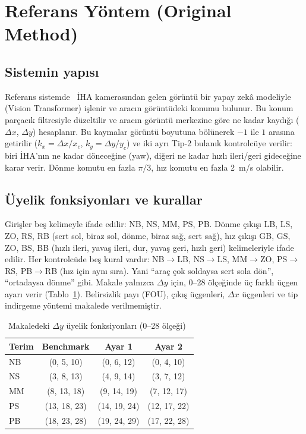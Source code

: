 \documentclass[conference,a4paper]{IEEEtran}
\begin{document}
\section{Referans Yöntem (Original Method)}
\subsection{Sistemin yapısı}
Referans sistemde~\cite{li2024} İHA kamerasından gelen görüntü bir yapay zekâ modeliyle (Vision Transformer) işlenir ve aracın görüntüdeki konumu bulunur. Bu konum parçacık filtresiyle düzeltilir ve aracın görüntü merkezine göre ne kadar kaydığı ($\Delta x$, $\Delta y$) hesaplanır. Bu kaymalar görüntü boyutuna bölünerek $-1$ ile $1$ arasına getirilir ($k_x=\Delta x/x_c$, $k_y=\Delta y/y_c$) ve iki ayrı Tip-2 bulanık kontrolcüye verilir: biri İHA'nın ne kadar döneceğine (yaw), diğeri ne kadar hızlı ileri/geri gideceğine karar verir. Dönme komutu en fazla $\pi/3$, hız komutu en fazla 2~m/s olabilir.

\subsection{Üyelik fonksiyonları ve kurallar}
Girişler beş kelimeyle ifade edilir: NB, NS, MM, PS, PB. Dönme çıkışı LB, LS, ZO, RS, RB (sert sol, biraz sol, dönme, biraz sağ, sert sağ), hız çıkışı GB, GS, ZO, BS, BB (hızlı ileri, yavaş ileri, dur, yavaş geri, hızlı geri) kelimeleriyle ifade edilir. Her kontrolcüde beş kural vardır: NB$\to$LB, NS$\to$LS, MM$\to$ZO, PS$\to$RS, PB$\to$RB (hız için aynı sıra). Yani ``araç çok soldaysa sert sola dön'', ``ortadaysa dönme'' gibi. Makale yalnızca $\Delta y$ için, 0--28 ölçeğinde üç farklı üçgen ayarı verir (Tablo~\ref{tab:mf}). Belirsizlik payı (FOU), çıkış üçgenleri, $\Delta x$ üçgenleri ve tip indirgeme yöntemi makalede verilmemiştir.

\begin{table}[t]
\centering
\caption{Makaledeki $\Delta y$ üyelik fonksiyonları (0--28 ölçeği)~\cite{li2024}}
\label{tab:mf}
\footnotesize
\begin{tabular}{@{}lccc@{}}
\toprule
Terim & Benchmark & Ayar 1 & Ayar 2 \\
\midrule
NB & (0, 5, 10) & (0, 6, 12) & (0, 4, 10) \\
NS & (3, 8, 13) & (4, 9, 14) & (3, 7, 12) \\
MM & (8, 13, 18) & (9, 14, 19) & (7, 12, 17) \\
PS & (13, 18, 23) & (14, 19, 24) & (12, 17, 22) \\
PB & (18, 23, 28) & (19, 24, 29) & (17, 22, 28) \\
\bottomrule
\end{tabular}
\end{table}
\end{document}

